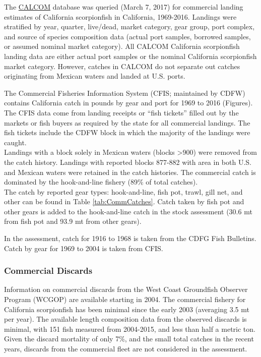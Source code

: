 \documentclass[12pt,]{article}
\begin{document}
The \href{http://128.114.3.187/}{CALCOM} database was queried (March 7,
2017) for commercial landing estimates of California scorpionfish in
California, 1969-2016. Landings were stratified by year, quarter,
live/dead, market category, gear group, port complex, and source of
species composition data (actual port samples, borrowed samples, or
assumed nominal market category). All CALCOM California scorpionfish
landing data are either actual port samples or the nominal California
scorpionfish market category. However, catches in CALCOM do not separate
out catches originating from Mexican waters and landed at U.S. ports.

The Commercial Fisheries Information System (CFIS; maintained by CDFW)
contains California catch in pounds by gear and port for 1969 to 2016
(Figures). The CFIS data come from landing receipts or ``fish tickets''
filled out by the markets or fish buyers as required by the state for
all commercial landings. The fish tickets include the CDFW block in
which the majority of the landings were caught.\\
Landings with a block solely in Mexican waters (blocks
\textgreater{}900) were removed from the catch history. Landings with
reported blocks 877-882 with area in both U.S. and Mexican waters were
retained in the catch histories. The commercial catch is dominated by
the hook-and-line fishery (89\% of total catches).\\
The catch by reported gear types: hook-and-line, fish pot, trawl, gill
net, and other can be found in Table \ref{tab:CommCatches}. Catch taken
by fish pot and other gears is added to the hook-and-line catch in the
stock assessment (30.6 mt from fish pot and 93.9 mt from other gears).

In the assessment, catch for 1916 to 1968 is taken from the CDFG Fish
Bulletins. Catch by gear for 1969 to 2004 is taken from CFIS.

\subsubsection{Commercial Discards}\label{commercial-discards}

Information on commercial discards from the West Coast Groundfish
Observer Program (WCGOP) are available starting in 2004. The commercial
fishery for California scorpionfish has been minimal since the early
2003 (averaging 3.5 mt per year). The available length composition data
from the observed discards is minimal, with 151 fish measured from
2004-2015, and less than half a metric ton. Given the discard mortality
of only 7\%, and the small total catches in the recent years, discards
from the commercial fleet are not considered in the assessment.
\end{document}
